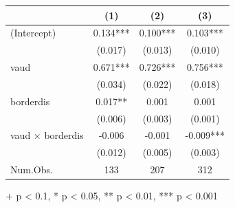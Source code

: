 \documentclass[
  letterpaper,
  DIV=11,
  oneside]{scrreprt}
\begin{document}
\setlength{\LTpost}{0mm}
\begin{longtable*}{lccc}
\toprule
  & (1) & (2) & (3) \\ 
\midrule
(Intercept) & 0.134*** & 0.100*** & 0.103*** \\ 
 & (0.017) & (0.013) & (0.010) \\ 
vaud & 0.671*** & 0.726*** & 0.756*** \\ 
 & (0.034) & (0.022) & (0.018) \\ 
borderdis & 0.017** & 0.001 & 0.001 \\ 
 & (0.006) & (0.003) & (0.001) \\ 
vaud × borderdis & -0.006 & -0.001 & -0.009*** \\ 
 & (0.012) & (0.005) & (0.003) \\ 
Num.Obs. & 133 & 207 & 312 \\ 
\bottomrule
\end{longtable*}
\begin{minipage}{\linewidth}
+ p < 0.1, * p < 0.05, ** p < 0.01, *** p < 0.001\\
\end{minipage}
\end{document}
